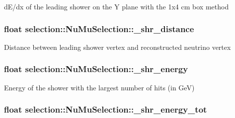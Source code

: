 d\-E/dx of the leading shower on the Y plane with the 1x4 cm box method \hypertarget{classselection_1_1NuMuSelection_a2da7e7448ef5334cb3988e5d7be786f3}{
\subsubsection[{\-\_\-shr\-\_\-distance}]{\setlength{\rightskip}{0pt plus 5cm}float selection\-::\-Nu\-Mu\-Selection\-::\-\_\-shr\-\_\-distance\hspace{0.3cm}{\ttfamily [private]}}}\label{classselection_1_1NuMuSelection_a2da7e7448ef5334cb3988e5d7be786f3}
Distance between leading shower vertex and reconstructed neutrino vertex \hypertarget{classselection_1_1NuMuSelection_a06ebfacd01494668815b794a793e58cf}{
\subsubsection[{\-\_\-shr\-\_\-energy}]{\setlength{\rightskip}{0pt plus 5cm}float selection\-::\-Nu\-Mu\-Selection\-::\-\_\-shr\-\_\-energy\hspace{0.3cm}{\ttfamily [private]}}}\label{classselection_1_1NuMuSelection_a06ebfacd01494668815b794a793e58cf}
Energy of the shower with the largest number of hits (in Ge\-V) \hypertarget{classselection_1_1NuMuSelection_a73da6cca89a0a1a854297f4d0a2ac851}{
\subsubsection[{\-\_\-shr\-\_\-energy\-\_\-tot}]{\setlength{\rightskip}{0pt plus 5cm}float selection\-::\-Nu\-Mu\-Selection\-::\-\_\-shr\-\_\-energy\-\_\-tot\hspace{0.3cm}{\ttfamily [private]}}}\label{classselection_1_1NuMuSelection_a73da6cca89a0a1a854297f4d0a2ac851}
